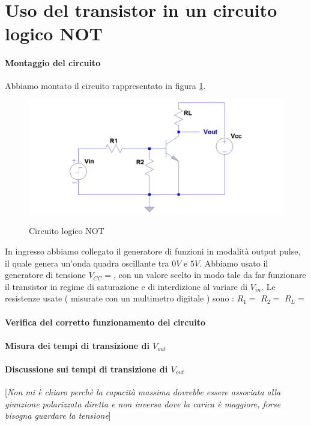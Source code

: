 \documentclass[10pt,a4paper]{article}
\newcommand{\rem}[1]{[\emph{#1}]}
\begin{document}

 
\section{Uso del transistor in un circuito logico NOT }
\paragraph{Montaggio del circuito}
Abbiamo montato il circuito rappresentato in  figura \ref{circuito2}.
\begin{figure}[!htb]
  \centering
  \includegraphics[scale=0.4]{circuito2} \label{circuito2}
\caption{Circuito logico NOT}
\label{circuito2}
\end{figure} 

In ingresso abbiamo collegato  il generatore di funzioni in modalità output pulse, il quale genera un’onda quadra oscillante tra $0 V$ e $5 V$. Abbiamo usato  il generatore di tensione $V_{CC}=$, con un valore scelto in modo tale da far funzionare il transistor  in regime di saturazione e di interdizione al variare di $V_{in}$. Le resistenze usate ( misurate con un multimetro digitale ) sono : $R_1=$ $R_2=$ $R_L=$


\paragraph{Verifica del corretto funzionamento del circuito}
\paragraph{Misura dei tempi di transizione di $V_{out}$ }

\paragraph{Discussione sui tempi di transizione di $ V_{out}$}

\rem{Non mi è chiaro perchè la capacità massima dovrebbe essere associata alla giunzione polarizzata diretta e non inversa dove la carica è maggiore, forse bisogna guardare la tensione}
\end{document}
